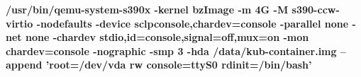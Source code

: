 \textbf{/usr/bin/qemu-system-s390x -kernel bzImage -m 4G -M s390-ccw-virtio -nodefaults -device sclpconsole,chardev=console -parallel none -net none -chardev stdio,id=console,signal=off,mux=on -mon chardev=console -nographic -smp 3 -hda /data/kub-container.img --append 'root=/dev/vda rw console=ttyS0 rdinit=/bin/bash'}

\Blindtext
